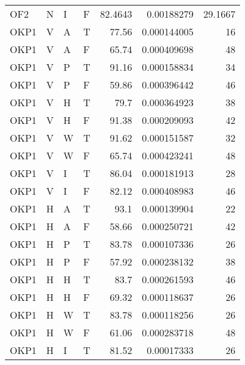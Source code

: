 \begin{longtable}{llllrrr}
    OF2      & N         & I         & F          & 82.4643    & 0.00188279  & 29.1667  \\
    OKP1     & V         & A         & T          & 77.56      & 0.000144005 & 16       \\
    OKP1     & V         & A         & F          & 65.74      & 0.000409698 & 48       \\
    OKP1     & V         & P         & T          & 91.16      & 0.000158834 & 34       \\
    OKP1     & V         & P         & F          & 59.86      & 0.000396442 & 46       \\
    OKP1     & V         & H         & T          & 79.7       & 0.000364923 & 38       \\
    OKP1     & V         & H         & F          & 91.38      & 0.000209093 & 42       \\
    OKP1     & V         & W         & T          & 91.62      & 0.000151587 & 32       \\
    OKP1     & V         & W         & F          & 65.74      & 0.000423241 & 48       \\
    OKP1     & V         & I         & T          & 86.04      & 0.000181913 & 28       \\
    OKP1     & V         & I         & F          & 82.12      & 0.000408983 & 46       \\
    OKP1     & H         & A         & T          & 93.1       & 0.000139904 & 22       \\
    OKP1     & H         & A         & F          & 58.66      & 0.000250721 & 42       \\
    OKP1     & H         & P         & T          & 83.78      & 0.000107336 & 26       \\
    OKP1     & H         & P         & F          & 57.92      & 0.000238132 & 38       \\
    OKP1     & H         & H         & T          & 83.7       & 0.000261593 & 46       \\
    OKP1     & H         & H         & F          & 69.32      & 0.000118637 & 26       \\
    OKP1     & H         & W         & T          & 83.78      & 0.000118256 & 26       \\
    OKP1     & H         & W         & F          & 61.06      & 0.000283718 & 48       \\
    OKP1     & H         & I         & T          & 81.52      & 0.00017333  & 26       \\

\end{longtable}

